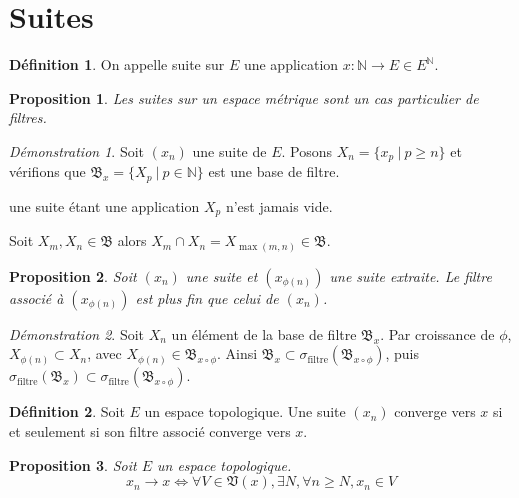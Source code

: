 \documentclass[a4paper, 11pt, french]{book}
\newenvironment{itemise}{\itemize}{\enditemize}
\theoremstyle{plain} %
\newtheorem{proposition}{Proposition}
\theoremstyle{definition} %
\newtheorem{definition}{Définition}
\theoremstyle{remark} %
\newtheorem*{demonstration}{Démonstration}
\newcommand{\1}{\mathds{1}}
\newcommand{\N}{\mathbb{N}}
\renewcommand{\frak}[1]{\mathfrak{#1}}
\renewcommand{\rm}[1]{\mathrm{#1}}
\newcommand\ens[2]{\{#1 \ |\ #2\}}
\begin{document}
\section{Suites}

\begin{definition}
	On appelle suite sur $E$ une application $x:\N\rightarrow E\in E^\N$.
\end{definition}

\begin{proposition}
	Les suites sur un espace métrique sont un cas particulier de filtres.
\end{proposition}

\begin{demonstration}
	Soit $(x_n)$ une suite de $E$.
	Posons $X_n=\ens{x_p}{p\geqslant n}$ et vérifions que $\frak{B}_x=\ens{X_p}{p\in\N}$ est une base de filtre.
	\begin{itemise}
		\item une suite étant une application $X_p$ n'est jamais vide.
		\item Soit $X_m, X_n\in\frak{B}$ alors $X_m\cap X_n=X_{\max(m, n)}\in\frak{B}$.
	\end{itemise}
\end{demonstration}

\begin{proposition}
	Soit $(x_n)$ une suite et $(x_{\phi(n)})$ une suite extraite.
	Le filtre associé à $(x_{\phi(n)})$ est plus fin que celui de $(x_n)$.
\end{proposition}

\begin{demonstration}
	Soit $X_n$ un élément de la base de filtre $\frak{B}_x$.
	Par croissance de $\phi$, $X_{\phi(n)}\subset X_n$, avec $X_{\phi(n)}\in\frak{B}_{x\circ\phi}$.
	Ainsi $\frak{B}_x\subset\sigma_\rm{filtre}(\frak{B}_{x\circ\phi})$, puis $\sigma_\rm{filtre}(\frak{B}_x)\subset\sigma_\rm{filtre}(\frak{B}_{x\circ\phi})$.
\end{demonstration}

\begin{definition}
	Soit $E$ un espace topologique.
	Une suite $(x_n)$ converge vers $x$ si et seulement si son filtre associé converge vers $x$.
\end{definition}

\begin{proposition}
	Soit $E$ un espace topologique.
	$$
	x_n\rightarrow x
	\iff
	\forall V\in\frak{V}(x), \exists N, \forall n\geqslant N, x_n\in V
	$$
\end{proposition}
\end{document}
